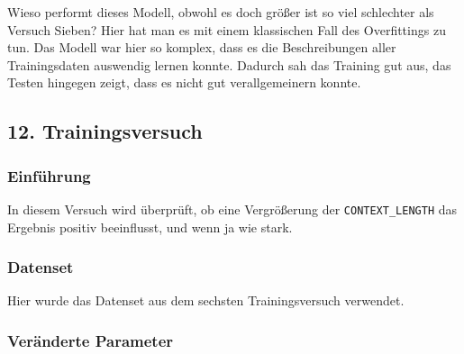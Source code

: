 \documentclass[pdftex,a4paper,halfparskip, article]{scrartcl}
\begin{document}
Wieso performt dieses Modell, obwohl es doch größer ist so viel schlechter als Versuch Sieben? Hier hat man es mit einem klassischen Fall des Overfittings zu tun. Das Modell war hier so komplex, dass es die Beschreibungen aller Trainingsdaten auswendig lernen konnte. Dadurch sah das Training gut aus, das Testen hingegen zeigt, dass es nicht gut verallgemeinern konnte.


\subsection{12. Trainingsversuch}
\subsubsection*{Einführung}

In diesem Versuch wird überprüft, ob eine Vergrößerung der \texttt{CONTEXT\_LENGTH} das Ergebnis positiv beeinflusst, und wenn ja wie stark. 

\subsubsection*{Datenset}

Hier wurde das Datenset aus dem sechsten Trainingsversuch verwendet.

\subsubsection*{Veränderte Parameter}
\end{document}
